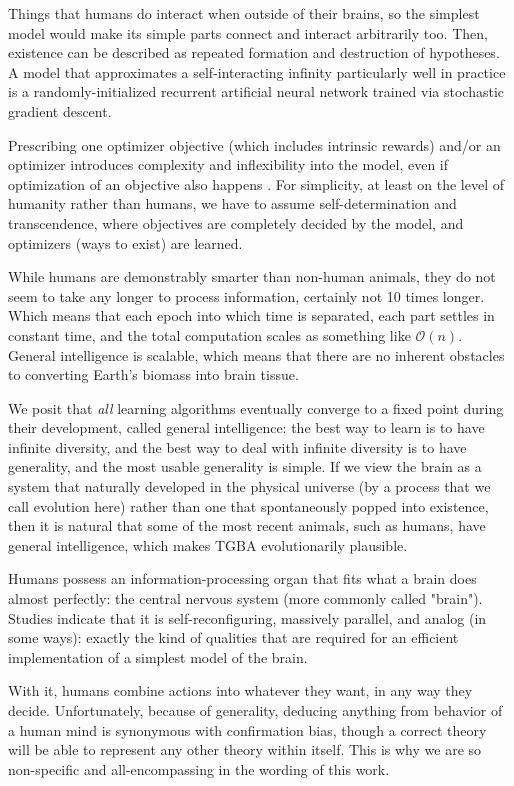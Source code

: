 \documentclass{article}
\begin{document}
Things that humans do interact when outside of their brains, so the simplest model would make its simple parts connect and interact arbitrarily too. Then, existence can be described as repeated formation and destruction of hypotheses. A model that approximates a self-interacting infinity particularly well in practice is a randomly-initialized recurrent artificial neural network trained via stochastic gradient descent.

Prescribing one optimizer objective (which includes intrinsic rewards) and/or an optimizer introduces complexity and inflexibility into the model, even if optimization of an objective also happens \cite{Dabney2020}. For simplicity, at least on the level of humanity rather than humans, we have to assume self-determination and transcendence, where objectives are completely decided by the model, and optimizers (ways to exist) are learned.

While humans are demonstrably smarter than non-human animals, they do not seem to take any longer to process information, certainly not 10 times longer. Which means that each epoch into which time is separated, each part settles in constant time, and the total computation scales as something like $\mathcal{O}(n)$. General intelligence is scalable, which means that there are no inherent obstacles to converting Earth's biomass into brain tissue.

We posit that \textit{all} learning algorithms eventually converge to a fixed point during their development, called general intelligence: the best way to learn is to have infinite diversity, and the best way to deal with infinite diversity is to have generality, and the most usable generality is simple. If we view the brain as a system that naturally developed in the physical universe (by a process that we call evolution here) rather than one that spontaneously popped into existence, then it is natural that some of the most recent animals, such as humans, have general intelligence, which makes TGBA evolutionarily plausible.

Humans possess an information-processing organ that fits what a brain does almost perfectly: the central nervous system (more commonly called "brain"). Studies indicate that it is self-reconfiguring, massively parallel, and analog (in some ways): exactly the kind of qualities that are required for an efficient implementation of a simplest model of the brain.

With it, humans combine actions into whatever they want, in any way they decide. Unfortunately, because of generality, deducing anything from behavior of a human mind is synonymous with confirmation bias, though a correct theory will be able to represent any other theory within itself. This is why we are so non-specific and all-encompassing in the wording of this work.
\end{document}
